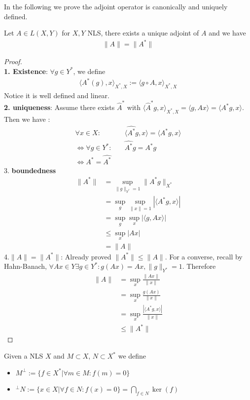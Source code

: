 In the following we prove the adjoint operator is canonically and uniquely defined. 
\begin{theorem}
	Let $A \in L(X, Y)$ for $X, Y$ NLS, there exists a unique adjoint of $A$ and we have
	\begin{align*}
		\|A\| = \|A^*\|
	\end{align*}
\end{theorem}
\begin{proof}\quad\\
\textbf{1. Existence}: $\forall g \in Y^*$, we define
\begin{align*}
	\langle A^*(g), x \rangle_{X^*, X} := \langle g \circ A,  x \rangle_{X^*, X}
\end{align*}
Notice it is well defined and linear.\\
\textbf{2. uniqueness}: Assume there exists $\hat{A}^*$ with $\langle \hat{A}^*g, x \rangle_{X^*, X} = \langle g, Ax\rangle = \langle A^*g, x\rangle.$ Then we have :
\begin{align*}
	\forall x \in X: &\quad \langle \hat{A^*}g, x\rangle = \langle A^*g, x \rangle\\
	\Leftrightarrow
	\forall g \in Y^*: &\quad \hat{A^*} g = A^* g\\
	\Leftrightarrow A^* = \hat{A^*} 
\end{align*} 
3. \textbf{boundedness}
\begin{align*}
	\|A^*\| &= \sup_{\|g\|_{Y^*} = 1} \|A^* g\|_{X^*}\\
	&= \sup_g \sup_{\|x\| = 1}|\langle A^*g, x \rangle|\\
	&= \sup_g \sup_x |\langle g, Ax\rangle|\\
	&\le \sup_x |Ax|\\
	&= \|A\|
\end{align*}
4.$\|A\| = \|A^*\|$: Already proved $\|A^*\| \le \|A\|$. For a converse, recall by Hahn-Banach, $\forall Ax \in Y \exists g \in Y^*: g(Ax) = Ax, \|g\|_{Y^*} = 1$. Therefore
\begin{align*}
	\|A\| &= \sup_x \frac{\|Ax\|}{\|x\|}\\
	&= \sup_x\frac{g(Ax)}{\|x\|}\\
	&= \sup_x \frac{|\langle A^*g , x\rangle |}{\|x\|}\\
	&\le \|A^*\|
\end{align*}
\end{proof}

\begin{definition}
Given a NLS $X$ and $M \subset X$, $N \subset X^*$ we define
\begin{itemize}
	\item $M^\perp := \{f \in X^*| \forall m \in M: f(m) = 0\}$
	\item ${}^\perp N:= \{x \in X| \forall f \in N: f(x) = 0\} = \bigcap_{f \in N} \ker (f)$
\end{itemize}
\end{definition}


